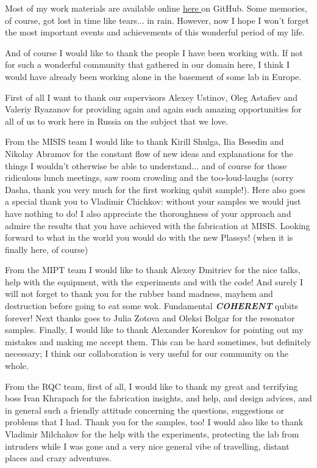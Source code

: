\documentclass[12pt, twoside]{report}
\numberwithin{equation}{section}
\begin{document}
Most of my work materials are available online \href{https://github.com/vdrhtc}{here \footnotesize{\faExternalLink}} on GitHub. Some memories, of course, got lost in time like tears... in rain. However, now I hope I won't forget the most important events and achievements of this wonderful period of my life.

And of course I would like to thank the people I have been working with. If not for such a wonderful community that gathered in our domain here, I think I would have already been working alone in the basement of some lab in Europe.

First of all I want to thank our supervisors Alexey Ustinov, Oleg Astafiev and Valeriy Ryazanov for providing again and again such amazing opportunities for all of us to work here in Russia on the subject that we love.

From the MISIS team I would like to thank Kirill Shulga, Ilia Besedin and Nikolay Abramov for the constant flow of new ideas and explanations for the things I wouldn't otherwise be able to understand... and of course for those ridiculous lunch meetings, saw room crowding and the too-loud-laughs (sorry Dasha, thank you very much for the first working qubit sample!). Here also goes a special thank you to Vladimir Chichkov: without your samples we would just have nothing to do! I also appreciate the thoroughness of your approach and admire the results that you have achieved with the fabrication at MISIS. Looking forward to what in the world you would do with the new Plassys! (when it is finally here, of course)

From the MIPT team I would like to thank Alexey Dmitriev for the nice talks, help with the equipment, with the experiments and with the code! And surely I will not forget to thank you for the rubber band madness, mayhem and destruction before going to eat some wok. Fundamental \textit{\textbf{COHERENT}} qubits forever! Next thanks goes to Julia Zotova and Oleksi Bolgar for the resonator samples. Finally, I would like to thank Alexander Korenkov for pointing out my mistakes and making me accept them. This can be hard sometimes, but definitely necessary; I think our collaboration is very useful for our community on the whole.

From the RQC team, first of all, I would like to thank my great and terrifying boss Ivan Khrapach for the fabrication insights, and help, and design advices, and in general such a friendly attitude concerning the questions, suggestions or problems that I had. Thank you for the samples, too! I would also like to thank Vladimir Milchakov for the help with the experiments, protecting the lab from intruders while I was gone and a very nice general vibe of travelling, distant places and crazy adventures.
\end{document}

